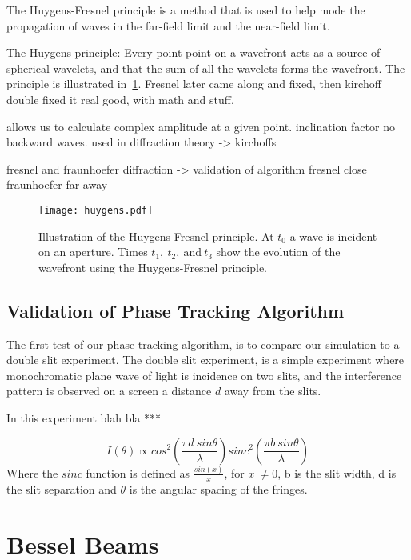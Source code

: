 The Huygens-Fresnel principle is a method that is used to help mode the propagation of waves in the far-field limit and the near-field limit. 

The Huygens principle: Every point point on a wavefront acts as a source of spherical wavelets, and that the sum of all the wavelets forms the wavefront. 
The principle is illustrated in~\cref{fig:huygensillis}. 
Fresnel later came along and fixed, then kirchoff double fixed it real good, with math and stuff.


allows us to calculate complex amplitude at a given point. 
inclination factor no backward waves.
used in diffraction theory -> kirchoffs

fresnel and fraunhoefer diffraction -> validation of algorithm
fresnel close
fraunhoefer far away

\begin{figure}[!ht]
    \centering
    \texttt{[image: huygens.pdf]}
    \caption{Illustration of the Huygens-Fresnel principle. At $t_0$ a wave is incident on an aperture. Times $t_1,\ t_2,\ \text{and}\ t_3$ show the evolution of the wavefront using the Huygens-Fresnel principle.}
    \label{fig:huygensillis}
\end{figure}

\subsection{Validation of Phase Tracking Algorithm}

The first test of our phase tracking algorithm, is to compare our simulation to a double slit experiment.
The double slit experiment, is a simple experiment where monochromatic plane wave of light is incidence on two slits, and the interference pattern is observed on a screen a distance $d$ away from the slits.

In this experiment blah bla ***

\begin{equation}
    I(\theta) \propto cos^2\left(\frac{\pi d\ sin \theta}{\lambda}\right)sinc^2\left(\frac{\pi b\ sin\theta}{\lambda}\right)
\end{equation}
Where the $sinc$ function is defined as $\tfrac{sin(x)}{x}$, for $x\ \neq 0$, b is the slit width, d is the slit separation and $\theta$ is the angular spacing of the fringes.

\section{Bessel Beams}


